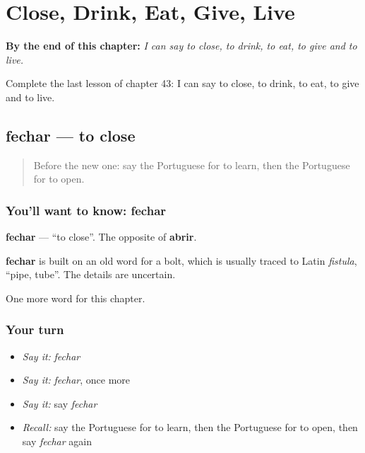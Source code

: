 
\chapter{Close, Drink, Eat, Give, Live}
\label{ch:pt-close-drink-eat-give-live}

\begin{chapteropening}
\textbf{By the end of this chapter:} \emph{I can say to close, to drink, to eat, to give and to live.}

Complete the last lesson of chapter 43: I can say to close, to drink, to eat, to give and to live.
\end{chapteropening}

\section[fechar]{fechar — to close}

\label{lesson:PT-C43-fechar}



\begin{quote}
Before the new one: say the Portuguese for to learn, then the Portuguese for to open.
\end{quote}

\subsection*{You'll want to know: fechar}
\textbf{fechar} — \textquotedblleft{}to close\textquotedblright{}. The opposite of \textbf{abrir}.

\begin{cousinweb}
\textbf{fechar} is built on an old word for a bolt, which is usually traced to Latin \emph{fistula}, \textquotedblleft{}pipe, tube\textquotedblright{}. The details are uncertain.
\end{cousinweb}

\begin{grammarlens}[title={What you've built}]
One more word for this chapter.
\end{grammarlens}

\subsection*{Your turn}
\begin{itemize}
\raggedright
  \item \emph{Say it:} \emph{fechar}
  \item \emph{Say it:} \emph{fechar}, once more
  \item \emph{Say it:} say \emph{fechar}
  \item \emph{Recall:} say the Portuguese for to learn, then the Portuguese for to open, then say \emph{fechar} again
\end{itemize}

